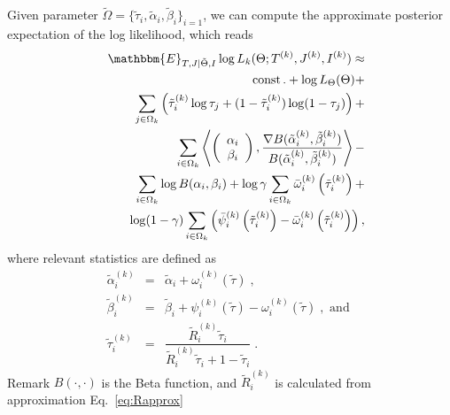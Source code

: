 \documentclass[10pt,journal,letterpaper,compsoc,twoside]{IEEEtran}
\newcommand{\nobracket}{}
\newcommand{\nosymbol}{}
\newcommand{\tmop}[1]{\ensuremath{\operatorname{#1}}}
\begin{document}
Given parameter $\tilde{\Omega} = \{ \tilde{\tau}_{i} , \tilde{\alpha}_{i} ,
\tilde{\beta}_{i} \}_{i=1}$, we can compute the approximate posterior
expectation of the log likelihood, which reads 
\begin{eqnarray}
&&\mathbbm{E}_{T,J |
\tilde{\Theta} ,I \nobracket} \log  L_{k} ( \Theta ;T^{( k )} ,J^{( k )} ,I^{(
k )} ) \approx \nonumber \\ 
&&  \tmop{const} \nosymbol .+ \log L_{\Theta} (\Theta) + \nonumber \\ 
&&  \sum_{j \in \Omega_{k}} \left( \tilde{\tau}_{i}^{( k )} \log
  \tau_{j} + ( 1-\tilde{\tau}_{i}^{( k )} ) \log ( 1- \tau_{j} ) \right) + \nonumber \\
&&  \sum_{i \in \Omega_{k}} \left\langle \left(\begin{array}{c}
    \alpha_{i} \\
 \beta_{i}
  \end{array}\right) , \dfrac{\nabla B ( \tilde{\alpha}_{i}^{( k )} ,
  \tilde{\beta}_{i}^{( k )} )}{B ( \tilde{\alpha}_{i}^{( k )} ,
  \tilde{\beta}_{i}^{( k )} )} \right\rangle - \nonumber \\ 
&&  \sum_{i \in \Omega_{k}} \log  B
  ( \alpha_{i} , \beta_{i} ) + 
 \log \gamma \sum_{i \in \Omega_{k}}
  \bar{\omega}_{i}^{( k )} \left( \tilde{\tau}_{i}^{( k )} \right) + \nonumber \\
&&  \log ( 1- \gamma ) \sum_{i \in
  \Omega_{k}} \left( \bar{\psi}_{i}^{( k )} \left( \tilde{\tau}_{i}^{( k )} \right) - \bar{\omega}_{i}^{(
  k )} \left( \tilde{\tau}_{i}^{( k )} \right) \right) ,
\end{eqnarray}
where relevant statistics are defined as
\begin{eqnarray}
\tilde{\alpha}_{i}^{( k )} &=& \tilde{\alpha}_{i} + \omega_{i}^{( k )} (
\tilde{\tau} )\;, \nonumber \\
\tilde{\beta}_{i}^{( k )} &=& \tilde{\beta}_{i} +
\psi_{i}^{( k )} ( \tilde{\tau} ) - \omega_{i}^{( k )} ( \tilde{\tau} )\;, \mbox{ and } \label{eq:statistics} \\ 
\tilde{\tau}_{i}^{( k )} &=& \dfrac{ \tilde{R}_{i}^{( k )} \tilde{\tau}_{i}}{
\tilde{R}_{i}^{( k )}  \tilde{\tau}_{i} +1- \tilde{\tau}_{i}}\;.\nonumber 
\end{eqnarray}
Remark 
$B(\cdot,\cdot)$ is the Beta function, and $\tilde{R}_{i}^{( k )}$ is calculated
from approximation Eq.~\eqref{eq:Rapprox}
\end{document}
